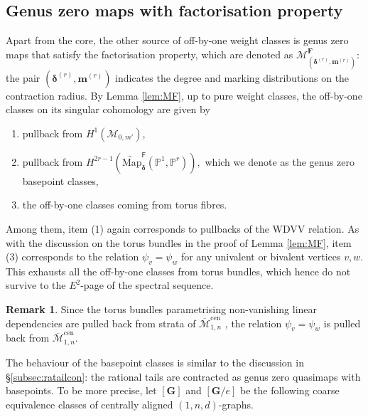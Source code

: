 \documentclass[12pt,reqno]{amsart}
\theoremstyle{definition}
\theoremstyle{definition}
\theoremstyle{definition}
\theoremstyle{definition}
\newtheorem{remark}[theorem]{Remark}
\newcommand{\ol}[1]{\overline{#1}}
\newcommand{\Mcal}{\mathcal{M}}
\newcommand{\Mbar}{\ol{\Mcal}}
\begin{document}
\subsection{Genus zero maps with factorisation property}
Apart from the core, the other source of off-by-one weight classes is genus zero maps that satisfy the factorisation property, which are denoted as $\mathcal{M}^{\mathbf{F}}_{(\boldsymbol{\delta}^{(r)}, \boldsymbol{m}^{(r)})}:$ the pair $(\boldsymbol{\delta}^{(r)}, \boldsymbol{m}^{(r)})$ indicates the degree and marking distributions on the contraction radius. By Lemma \ref{lem:MF}, up to pure weight classes, the off-by-one classes on its singular cohomology are given by \begin{enumerate}
  \item pullback from $H^1(\mathcal{M}_{0,m'})$,
  \item pullback from $H^{2r-1}(\widetilde{\mathrm{Map}}_{\boldsymbol{\delta}}^{\mathsf{F}}(\mathbb{P}^1, \mathbb{P}^r)),$ which we denote as the genus zero basepoint classes,
  \item the off-by-one classes coming from torus fibres.
\end{enumerate}

Among them, item (1) again corresponds to pullbacks of the WDVV relation. As with the discussion on the torus bundles in the proof of Lemma \ref{lem:MF}, item (3) corresponds to the relation $\psi_v = \psi_w$ for any univalent or bivalent vertices $v,w.$ This exhausts all the off-by-one classes from torus bundles, which hence do not survive to the $E^2$-page of the spectral sequence.

\begin{remark}
  Since the torus bundles parametrising non-vanishing linear dependencies are pulled back from strata of $\Mbar_{1,n}^{\mathrm{cen}}$ \cite{rspw}, the relation $\psi_v = \psi_w$ is pulled back from $\Mbar_{1,n}^{\mathrm{cen}}.$
\end{remark}

The behaviour of the basepoint classes is similar to the discussion in §\ref{subsec:ratailcon}: the rational tails are contracted as genus zero quasimaps with basepoints. To be more precise, let $[\mathbf{G}]$ and $[\mathbf{G}/e]$ be the following coarse equivalence classes of centrally aligned $(1,n,d)$-graphs.
\end{document}
